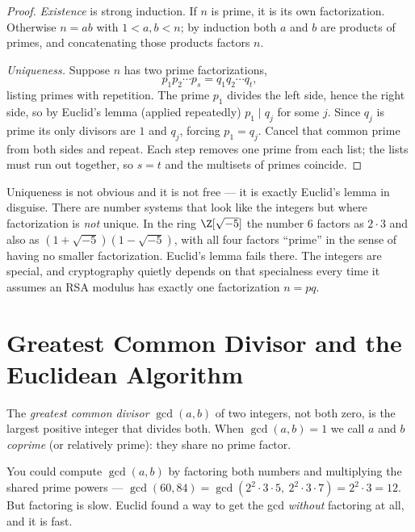 \begin{proof}
\emph{Existence} is strong induction. If $n$ is prime, it is its own factorization. Otherwise
$n = ab$ with $1 < a, b < n$; by induction both $a$ and $b$ are products of primes, and
concatenating those products factors $n$.

\emph{Uniqueness.} Suppose $n$ has two prime factorizations,
\[
  p_1 p_2 \cdots p_s = q_1 q_2 \cdots q_t,
\]
listing primes with repetition. The prime $p_1$ divides the left side, hence the right side, so by
Euclid's lemma (applied repeatedly) $p_1 \mid q_j$ for some $j$. Since $q_j$ is prime its only
divisors are $1$ and $q_j$, forcing $p_1 = q_j$. Cancel that common prime from both sides and
repeat. Each step removes one prime from each list; the lists must run out together, so $s = t$ and
the multisets of primes coincide.
\end{proof}

\begin{focusbox}
Uniqueness is not obvious and it is not free --- it is exactly Euclid's lemma in disguise. There are
number systems that look like the integers but where factorization is \emph{not} unique. In the
ring $\Z[\sqrt{-5}]$ the number $6$ factors as $2 \cdot 3$ and also as $(1+\sqrt{-5})(1-\sqrt{-5})$,
with all four factors ``prime'' in the sense of having no smaller factorization. Euclid's lemma
fails there. The integers are special, and cryptography quietly depends on that specialness every
time it assumes an RSA modulus has exactly one factorization $n = pq$.
\end{focusbox}

\section{Greatest Common Divisor and the Euclidean Algorithm}
\label{ch04:euclid}

\begin{definition}[GCD]
\label{ch04:def-gcd}
The \emph{greatest common divisor} $\gcd(a, b)$ of two integers, not both zero, is the largest
positive integer that divides both. When $\gcd(a, b) = 1$ we call $a$ and $b$ \emph{coprime} (or
relatively prime): they share no prime factor.
\end{definition}

You could compute $\gcd(a,b)$ by factoring both numbers and multiplying the shared prime powers ---
$\gcd(60, 84) = \gcd(2^2 \cdot 3 \cdot 5,\ 2^2 \cdot 3 \cdot 7) = 2^2 \cdot 3 = 12$. But factoring is
slow. Euclid found a way to get the gcd \emph{without} factoring at all, and it is fast.

